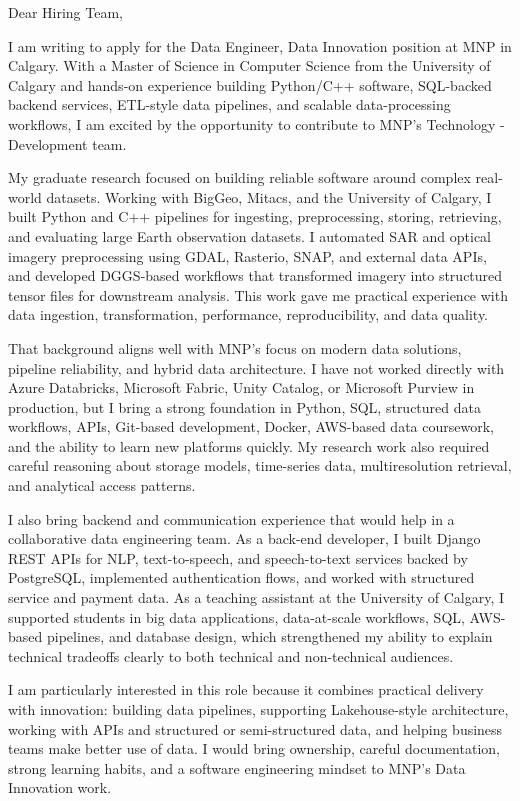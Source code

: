 \documentclass[11pt]{letter}
\begin{document}
\begin{letter}{}

\opening{Dear Hiring Team,}

I am writing to apply for the Data Engineer, Data Innovation position at MNP in Calgary. With a Master of Science in Computer Science from the University of Calgary and hands-on experience building Python/C++ software, SQL-backed backend services, ETL-style data pipelines, and scalable data-processing workflows, I am excited by the opportunity to contribute to MNP's Technology - Development team.

My graduate research focused on building reliable software around complex real-world datasets. Working with BigGeo, Mitacs, and the University of Calgary, I built Python and C++ pipelines for ingesting, preprocessing, storing, retrieving, and evaluating large Earth observation datasets. I automated SAR and optical imagery preprocessing using GDAL, Rasterio, SNAP, and external data APIs, and developed DGGS-based workflows that transformed imagery into structured tensor files for downstream analysis. This work gave me practical experience with data ingestion, transformation, performance, reproducibility, and data quality.

That background aligns well with MNP's focus on modern data solutions, pipeline reliability, and hybrid data architecture. I have not worked directly with Azure Databricks, Microsoft Fabric, Unity Catalog, or Microsoft Purview in production, but I bring a strong foundation in Python, SQL, structured data workflows, APIs, Git-based development, Docker, AWS-based data coursework, and the ability to learn new platforms quickly. My research work also required careful reasoning about storage models, time-series data, multiresolution retrieval, and analytical access patterns.

I also bring backend and communication experience that would help in a collaborative data engineering team. As a back-end developer, I built Django REST APIs for NLP, text-to-speech, and speech-to-text services backed by PostgreSQL, implemented authentication flows, and worked with structured service and payment data. As a teaching assistant at the University of Calgary, I supported students in big data applications, data-at-scale workflows, SQL, AWS-based pipelines, and database design, which strengthened my ability to explain technical tradeoffs clearly to both technical and non-technical audiences.

I am particularly interested in this role because it combines practical delivery with innovation: building data pipelines, supporting Lakehouse-style architecture, working with APIs and structured or semi-structured data, and helping business teams make better use of data. I would bring ownership, careful documentation, strong learning habits, and a software engineering mindset to MNP's Data Innovation work.


\end{letter}
\end{document}
